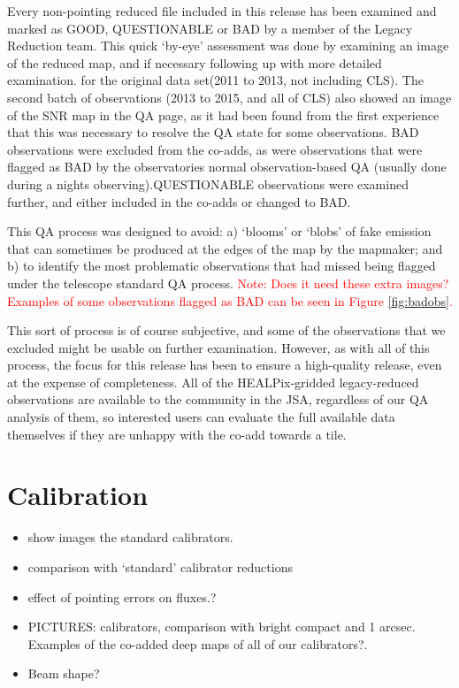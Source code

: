\documentclass[twocolumn,times]{aastex6}
\newcommand{\note}[1]{\textcolor{red}{Note: #1}}
\newcommand{\status}[1]{\textsf{#1}}
\begin{document}
Every non-pointing reduced file included in this release has been
examined and marked as \status{GOOD}, \status{QUESTIONABLE} or
\status{BAD} by a member of the Legacy Reduction team. This quick
`by-eye' assessment was done by examining an image of the reduced map,
and if necessary following up with more detailed examination. for the
original data set(2011 to 2013, not including CLS). The second batch
of observations (2013 to 2015, and all of CLS) also showed an image of
the SNR map in the QA page, as it had been found from the first
experience that this was necessary to resolve the QA state for some
observations. \status{BAD} observations were excluded from the co-adds,
as were observations that were flagged as \status{BAD} by the
observatories normal observation-based QA (usually done during a
nights observing).\status{QUESTIONABLE} observations were examined
further, and either included in the co-adds or changed to \status{BAD}.


This QA process was designed to avoid: a) `blooms' or `blobs' of fake
emission that can sometimes be produced at the edges of the map by the
mapmaker; and b) to identify the most problematic observations that
had missed being flagged under the telescope standard QA
process. \note{Does it need these extra images? Examples of some
  observations flagged as BAD can be seen in Figure \ref{fig:badobs}.}

This sort of process is of course subjective, and some of the
observations that we excluded might be usable on further
examination. However, as with all of this process, the focus for this
release has been to ensure a high-quality release, even at the expense
of completeness. All of the HEALPix-gridded legacy-reduced
observations are available to the community in the JSA, regardless of
our QA analysis of them, so interested users can evaluate the full
available data themselves if they are unhappy with the co-add towards a
tile.


\section{Calibration}
\label{sec:calib}


\begin{itemize}
\item show images the standard calibrators.
\item comparison with `standard' calibrator reductions
\item effect of pointing errors on fluxes.?
\item PICTURES: calibrators, comparison with bright compact and 1
  arcsec. Examples of the co-added deep maps of all of our
  calibrators?.
\item Beam shape?
\end{itemize}
\end{document}
